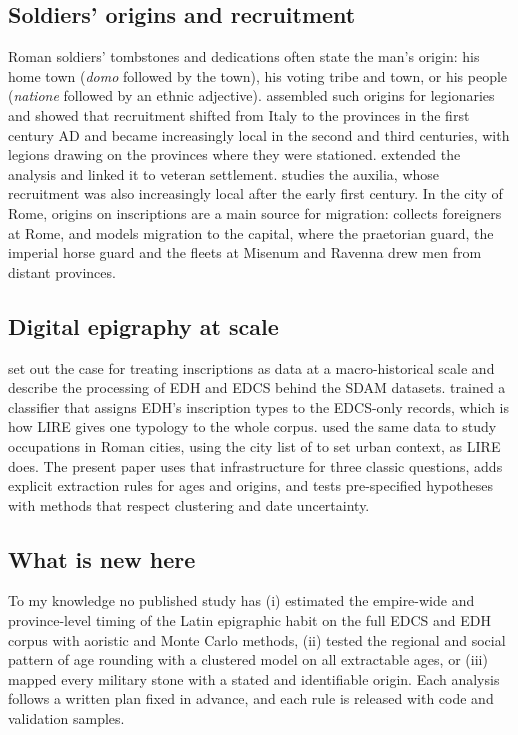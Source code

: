 \documentclass[11pt,a4paper]{article}
\begin{document}
\subsection{Soldiers' origins and recruitment}
Roman soldiers' tombstones and dedications often state the man's origin: his home town (\textit{domo} followed by the town), his voting tribe and town, or his people (\textit{natione} followed by an ethnic adjective). \citet{forni1953} assembled such origins for legionaries and showed that recruitment shifted from Italy to the provinces in the first century AD and became increasingly local in the second and third centuries, with legions drawing on the provinces where they were stationed. \citet{mann1983} extended the analysis and linked it to veteran settlement. \citet{haynes2013} studies the auxilia, whose recruitment was also increasingly local after the early first century. In the city of Rome, origins on inscriptions are a main source for migration: \citet{noy2000} collects foreigners at Rome, and \citet{tacoma2016} models migration to the capital, where the praetorian guard, the imperial horse guard and the fleets at Misenum and Ravenna drew men from distant provinces.

\subsection{Digital epigraphy at scale}
\citet{hermankova2021} set out the case for treating inscriptions as data at a macro-historical scale and describe the processing of EDH and EDCS behind the SDAM datasets. \citet{kase2021classifying} trained a classifier that assigns EDH's inscription types to the EDCS-only records, which is how LIRE gives one typology to the whole corpus. \citet{kase2022division} used the same data to study occupations in Roman cities, using the city list of \citet{hanson2016} to set urban context, as LIRE does. The present paper uses that infrastructure for three classic questions, adds explicit extraction rules for ages and origins, and tests pre-specified hypotheses with methods that respect clustering and date uncertainty.

\subsection{What is new here}
To my knowledge no published study has (i) estimated the empire-wide and province-level timing of the Latin epigraphic habit on the full EDCS and EDH corpus with aoristic and Monte Carlo methods, (ii) tested the regional and social pattern of age rounding with a clustered model on all extractable ages, or (iii) mapped every military stone with a stated and identifiable origin. Each analysis follows a written plan fixed in advance, and each rule is released with code and validation samples.
\end{document}
